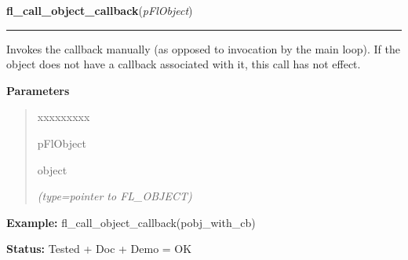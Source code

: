     \vspace{0.5ex}

\hspace{.8\funcindent}\begin{boxedminipage}{\funcwidth}

    \raggedright \textbf{fl\_call\_object\_callback}(\textit{pFlObject})

    \vspace{-1.5ex}

    \rule{\textwidth}{0.5\fboxrule}
\setlength{\parskip}{2ex}
    Invokes the callback manually (as opposed to invocation by the main 
    loop). If the object does not have a callback associated with it, this 
    call has not effect.

\setlength{\parskip}{1ex}
      \textbf{Parameters}
      \vspace{-1ex}

      \begin{quote}
        \begin{Ventry}{xxxxxxxxx}

          \item[pFlObject]

          object

            {\it (type=pointer to FL\_OBJECT)}

        \end{Ventry}

      \end{quote}

\textbf{Example:} fl\_call\_object\_callback(pobj\_with\_cb)



\textbf{Status:} Tested + Doc + Demo = OK



    \end{boxedminipage}

    \label{xformslib:flbasic:fl_set_object_prehandler}

    \vspace{0.5ex}

